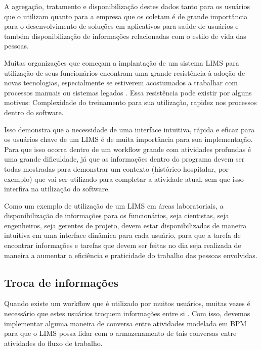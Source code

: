 A agregação, tratamento e disponibilização destes dados tanto para os usuários que o utilizam quanto para a empresa que os coletam é de grande importância para o desenvolvimento de soluções em aplicativos para saúde de usuários e também disponibilização de informações relacionadas com o estilo de vida das pessoas.


Muitas organizações que começam a implantação de um sistema LIMS para utilização de seus funcionários encontram uma grande resistência à adoção de novas tecnologias, especialmente se estiverem acostumados a trabalhar com processos manuais ou sistemas legados \R. Essa resistência pode existir por alguns motivos: Complexidade do treinamento para sua utilização, rapidez nos processos dentro do software.

Isso demonstra que a necessidade de uma interface intuitiva, rápida e eficaz para os usuários chave de um LIMS é de muita importância para sua implementação. Para que isso ocorra dentro de um workflow grande com atividades profundas é uma grande dificuldade, já que as informações dentro do programa devem ser todas mostradas para demonstrar um contexto (histórico hospitalar, por exemplo) que vai ser utilizado para completar a atividade atual, sem que isso interfira na utilização do software.


Como um exemplo de utilização de um LIMS em áreas laboratoriais, a disponibilização de informações para os funcionários, seja cientistas, seja engenheiros, seja gerentes de projeto, devem estar disponibilizadas de maneira intuitiva em uma interface dinâmica para cada usuário, para que a tarefa de encontrar informações e tarefas que devem ser feitas no dia seja realizada de maneira a aumentar a eficiência e praticidade do trabalho das pessoas envolvidas.

\subsection{Troca de informações}


Quando existe um workflow que é utilizado por muitos usuários, muitas vezes é necessário que estes usuários troquem informações entre si \R. Com isso, devemos implementar alguma maneira de conversa entre atividades modelada em BPM para que o LIMS possa lidar com o armazenamento de tais conversas entre atividades do fluxo de trabalho.

